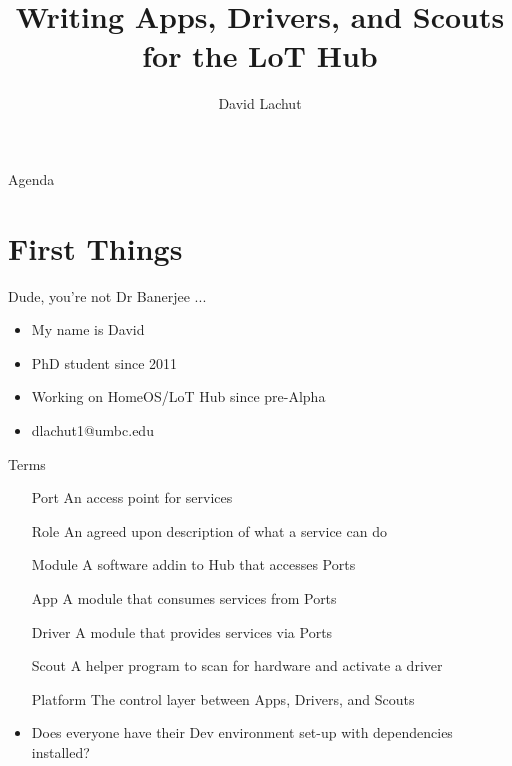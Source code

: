 \documentclass[11pt]{beamer}
\author{David Lachut}
\title{Writing Apps, Drivers, and Scouts for the LoT Hub}
\begin{document}
\begin{frame}
\titlepage
\end{frame}

\begin{frame}{Agenda}
\tableofcontents
\end{frame}

\section{First Things}

\begin{frame}{Dude, you're not Dr Banerjee ...}
    \begin{itemize}
        \item My name is David
        \item PhD student since 2011
        \item Working on HomeOS/LoT Hub since pre-Alpha
        \item dlachut1@umbc.edu
    \end{itemize}
\end{frame}

\begin{frame}{Terms}
    \begin{itemize}
        \item[Port]     An access point for services
        \item[Role]     An agreed upon description of what a service can do
        \item[Module]   A software addin to Hub that accesses Ports
        \item[App]      A module that consumes services from Ports
        \item[Driver]   A module that provides services via Ports
        \item[Scout]    A helper program to scan for hardware and activate a driver
        \item[Platform] The control layer between Apps, Drivers, and Scouts
    \end{itemize}
\end{frame}

\begin{frame}{}
    \begin{itemize}
        \item Does everyone have their Dev environment set-up with dependencies installed?
    \end{itemize}
\end{frame}
\end{document}
